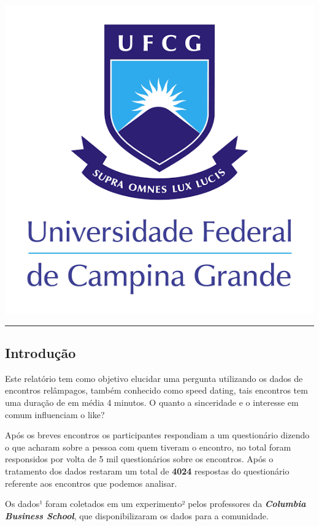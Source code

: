 \documentclass[]{article}
\begin{document}
\includegraphics{../dados/logo.png}

\newpage

\begin{center}\rule{0.5\linewidth}{\linethickness}\end{center}

\hypertarget{introduuxe7uxe3o}{%
\subsection{Introdução}\label{introduuxe7uxe3o}}

Este relatório tem como objetivo elucidar uma pergunta utilizando os
dados de encontros relâmpagos, também conhecido como speed dating, tais
encontros tem uma duração de em média 4 minutos. O quanto a sinceridade
e o interesse em comum influenciam o like?

Após os breves encontros os participantes respondiam a um questionário
dizendo o que acharam sobre a pessoa com quem tiveram o encontro, no
total foram responsidos por volta de 5 mil questionários sobre os
encontros. Após o tratamento dos dados restaram um total de
\textbf{4024} respostas do questionário referente aos encontros que
podemos analisar.

Os dados¹ foram coletados em um experimento² pelos professores da
\textbf{\emph{Columbia Business School}}, que disponibilizaram os dados
para a comunidade.
\end{document}
